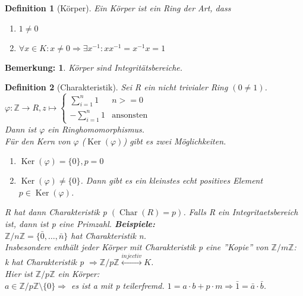 \documentclass{report}
\newcommand{\Z}{\mathbb{Z}}
\DeclareMathOperator{\Ker}{Ker}
\DeclareMathOperator{\Char}{Char}
\theoremstyle{customrem}
\newtheorem*{bemerkung}{Bemerkung\textnormal:}
\theoremstyle{customdef}
\newtheorem{definition}{Definition}[chapter]
\theoremstyle{customenv}
\begin{document}
\begin{definition}[K\"orper]
  Ein K\"orper ist ein Ring der Art, dass
  \begin{enumerate}
    \item{\(1 \neq 0\)}
    \item{
      \(
        \forall x \in K : x \neq 0
        \Rightarrow \exists x^{-1} : xx^{-1} = x^{-1}x = 1
      \)
    }
  \end{enumerate}
\end{definition}

\begin{bemerkung}
  K\"orper sind Integrit\"atsbereiche.
\end{bemerkung}

\begin{definition}[Charakteristik]
  Sei R ein nicht trivialer Ring \((0 \neq 1)\).
  \(
    \varphi : \Z \rightarrow R, z \mapsto
    \begin{cases}
      \sum_{i=1}^n 1 & n >= 0\\
      -\sum_{i=1}^n 1 & \text{ansonsten}
    \end{cases}
  \)\\
  Dann ist \(\varphi\) ein Ringhomomorphismus.\\
  F\"ur den Kern von \(\varphi\) (\(\Ker(\varphi)\)) gibt es zwei
  M\"oglichkeiten.
  \begin{enumerate}
    \item{\(\Ker(\varphi) = \{0\}, p = 0\)}
    \item{
      \(\Ker(\varphi) \neq \{0\}\). Dann gibt es ein kleinstes echt positives
      Element \(p \in \Ker(\varphi)\).
    }
  \end{enumerate}
  R hat dann Charakteristik p \((\Char(R) = p)\). Falls R ein
  Integritaetsbereich ist, dann ist p eine Primzahl.
  \textbf{Beispiele:}\\
  \(\Z / n\Z = \{\bar{0}, \dots, \bar{n}\}\) hat Charakteristik n.\\
  Insbesondere enth\"alt jeder K\"orper mit Charakteristik p eine ''Kopie'' von
  \(\Z / m\Z\):\\
  k hat Charakteristik p \(\Rightarrow \Z /p\Z
  \overset{injectiv}{\leftrightarrow} K\).\\
  Hier ist \(\Z/p\Z\) ein K\"orper:\\
  \(a \in \Z/p\Z \setminus \{0\} \Rightarrow\) es ist a mit p teilerfremd.
  \(1 = a \cdot b + p \cdot m \Rightarrow \bar{1} = \bar{a} \cdot \bar{b}\).
\end{definition}
\end{document}
